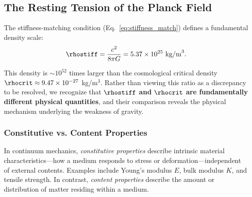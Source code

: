 %
%
%

\subsection{The Resting Tension of the Planck Field}
\label{sec:resting_tension}

The stiffness-matching condition (Eq.~\ref{eq:stiffness_match}) defines a fundamental density scale:
\begin{equation}
\label{eq:rho_stiff_tension}
\rhostiff = \frac{c^2}{8\pi G} = 5.37 \times 10^{25} \text{ kg/m}^3.
\end{equation}

This density is $\sim 10^{52}$ times larger than the cosmological critical density $\rhocrit \approx 9.47 \times 10^{-27}$ kg/m$^3$. Rather than viewing this ratio as a discrepancy to be resolved, we recognize that \textbf{$\rhostiff$ and $\rhocrit$ are fundamentally different physical quantities}, and their comparison reveals the physical mechanism underlying the weakness of gravity.

\subsubsection{Constitutive vs. Content Properties}
\label{sec:const_vs_content}

In continuum mechanics, \emph{constitutive properties} describe intrinsic material characteristics---how a medium responds to stress or deformation---independent of external contents. Examples include Young's modulus $E$, bulk modulus $K$, and tensile strength. In contrast, \emph{content properties} describe the amount or distribution of matter residing within a medium.

